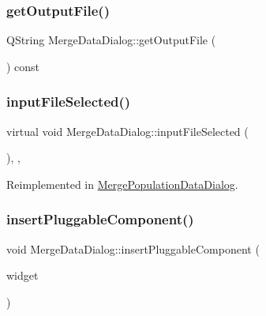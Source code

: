 \subsubsection{\texorpdfstring{getOutputFile()}{getOutputFile()}}
{\footnotesize\ttfamily Q\+String Merge\+Data\+Dialog\+::get\+Output\+File (\begin{DoxyParamCaption}{ }\end{DoxyParamCaption}) const}

\mbox{\label{class_merge_data_dialog_a88635c995b69051e1583b5e244ee7cc4}} 
\subsubsection{\texorpdfstring{inputFileSelected()}{inputFileSelected()}}
{\footnotesize\ttfamily virtual void Merge\+Data\+Dialog\+::input\+File\+Selected (\begin{DoxyParamCaption}{ }\end{DoxyParamCaption})\hspace{0.3cm}{\ttfamily [inline]}, {\ttfamily [protected]}, {\ttfamily [virtual]}}



Reimplemented in \mbox{\hyperlink{class_merge_population_data_dialog_a1989c5920eac03cff9706d32a8dfeaaf}{Merge\+Population\+Data\+Dialog}}.

\mbox{\label{class_merge_data_dialog_a1a84240e7c77154c6247a803bea66187}} 
\subsubsection{\texorpdfstring{insertPluggableComponent()}{insertPluggableComponent()}}
{\footnotesize\ttfamily void Merge\+Data\+Dialog\+::insert\+Pluggable\+Component (\begin{DoxyParamCaption}\item[{Q\+Widget $\ast$}]{widget }\end{DoxyParamCaption})\hspace{0.3cm}{\ttfamily [protected]}}

